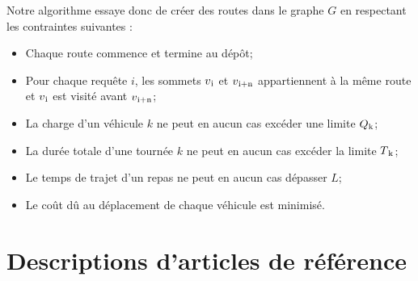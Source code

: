 \documentclass[10pt,a4paper]{report}
\begin{document}
Notre algorithme essaye donc de créer des routes dans le graphe $G$ en respectant les contraintes suivantes :
\begin{itemize}
\item Chaque route commence et termine au dépôt;
\item Pour chaque requête $i$, les sommets $v\textsubscript{i}$ et $v\textsubscript{i+n}$ appartiennent à la même route et $v\textsubscript{i}$ est visité avant $v\textsubscript{i+n}$;
\item La charge d'un véhicule $k$ ne peut en aucun cas excéder une limite $Q\textsubscript{k}$;
\item La durée totale d'une tournée $k$ ne peut en aucun cas excéder la limite $T\textsubscript{k}$;
\item Le temps de trajet d'un repas ne peut en aucun cas dépasser $L$;
\item Le coût dû au déplacement de chaque véhicule est minimisé. 
\end{itemize}


\section*{Descriptions d'articles de référence}
\end{document}
